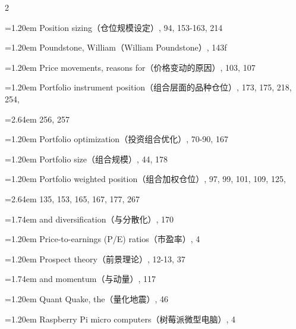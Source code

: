 {\begin{multicols}{2}
\par \noindent\hangindent=1.20em\hspace*{0.00em} Position sizing（仓位规模设定）, 94, 153-163, 214
\par \noindent\hangindent=1.20em\hspace*{0.00em} Poundstone, William（William Poundstone）, 143f
\par \noindent\hangindent=1.20em\hspace*{0.00em} Price movements, reasons for（价格变动的原因）, 103, 107
\par \noindent\hangindent=1.20em\hspace*{0.00em} Portfolio instrument position（组合层面的品种仓位）, 173, 175, 218, 254,
\par \noindent\hangindent=2.64em\hspace*{1.44em} 256, 257
\par \noindent\hangindent=1.20em\hspace*{0.00em} Portfolio optimization（投资组合优化）, 70-90, 167
\par \noindent\hangindent=1.20em\hspace*{0.00em} Portfolio size（组合规模）, 44, 178
\par \noindent\hangindent=1.20em\hspace*{0.00em} Portfolio weighted position（组合加权仓位）, 97, 99, 101, 109, 125,
\par \noindent\hangindent=2.64em\hspace*{1.44em} 135, 153, 165, 167, 177, 267
\par \noindent\hangindent=1.74em\hspace*{0.54em} and diversification（与分散化）, 170
\par \noindent\hangindent=1.20em\hspace*{0.00em} Price-to-earnings (P/E) ratios（市盈率）, 4
\par \noindent\hangindent=1.20em\hspace*{0.00em} Prospect theory（前景理论）, 12-13, 37
\par \noindent\hangindent=1.74em\hspace*{0.54em} and momentum（与动量）, 117
\par \noindent\hangindent=1.20em\hspace*{0.00em} Quant Quake, the（量化地震）, 46
\par \noindent\hangindent=1.20em\hspace*{0.00em} Raspberry Pi micro computers（树莓派微型电脑）, 4

\end{multicols}}
